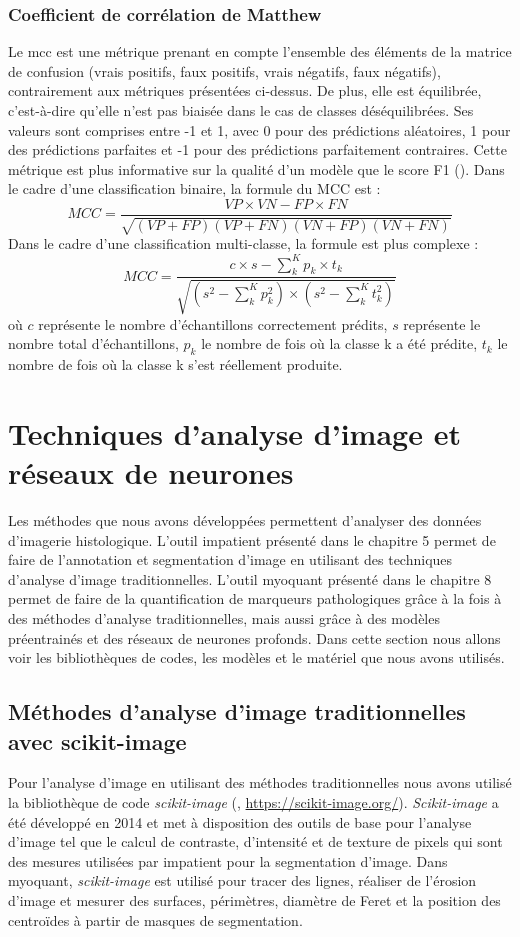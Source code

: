 \subsubsection{Coefficient de corrélation de Matthew}
Le \gls{mcc} est une métrique prenant en compte l'ensemble des éléments de la matrice de confusion (vrais positifs, faux positifs, vrais négatifs, faux négatifs), contrairement aux métriques présentées ci-dessus. De plus, elle est équilibrée, c'est-à-dire qu'elle n'est pas biaisée dans le cas de classes déséquilibrées. Ses valeurs sont comprises entre -1 et 1, avec 0 pour des prédictions aléatoires, 1 pour des prédictions parfaites et -1 pour des prédictions parfaitement contraires. Cette métrique est plus informative sur la qualité d'un modèle que le score F1 (\cite{chicco_advantages_2020}). Dans le cadre d'une classification binaire, la formule du MCC est :
\[ MCC = \frac{VP \times VN - FP \times FN}{\sqrt{(VP + FP)(VP + FN)(VN + FP)(VN + FN)}} \]
Dans le cadre d'une classification multi-classe, la formule est plus complexe :
\[ MCC = \frac{
    c \times s - \sum_{k}^{K} p_k \times t_k
}{\sqrt{
    (s^2 - \sum_{k}^{K} p_k^2) \times
    (s^2 - \sum_{k}^{K} t_k^2)
}} \]
où \(c\) représente le nombre d'échantillons correctement prédits, \(s\) représente le nombre total d'échantillons, \(p_k\) le nombre de fois où la classe k a été prédite, \(t_k\) le nombre de fois où la classe k s'est réellement produite.

\section{Techniques d'analyse d'image et réseaux de neurones}
Les méthodes que nous avons développées permettent d'analyser des données d'imagerie histologique. L'outil \gls{impatient} présenté dans le chapitre 5 permet de faire de l'annotation et segmentation d'image en utilisant des techniques d'analyse d'image traditionnelles. L'outil \gls{myoquant} présenté dans le chapitre 8 permet de faire de la quantification de marqueurs pathologiques grâce à la fois à des méthodes d'analyse traditionnelles, mais aussi grâce à des modèles préentrainés et des réseaux de neurones profonds.  Dans cette section nous allons voir les bibliothèques de codes, les modèles et le matériel que nous avons utilisés. 

\subsection{Méthodes d'analyse d'image traditionnelles avec scikit-image}
Pour l'analyse d'image en utilisant des méthodes traditionnelles nous avons utilisé la bibliothèque de code \textit{scikit-image} (\cite{walt_scikit-image_2014}, \url{https://scikit-image.org/}). \textit{Scikit-image} a été développé en 2014 et met à disposition des outils de base pour l'analyse d'image tel que le calcul de contraste, d'intensité et de texture de pixels qui sont des mesures utilisées par \gls{impatient} pour la segmentation d'image. Dans \gls{myoquant}, \textit{scikit-image} est utilisé pour tracer des lignes, réaliser de l'érosion d'image et mesurer des surfaces, périmètres, diamètre de Feret et la position des centroïdes à partir de masques de segmentation.

